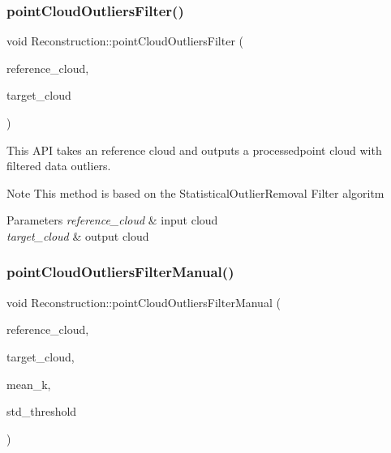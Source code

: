 \subsubsection{\texorpdfstring{point\+Cloud\+Outliers\+Filter()}{pointCloudOutliersFilter()}}
{\footnotesize\ttfamily void Reconstruction\+::point\+Cloud\+Outliers\+Filter (\begin{DoxyParamCaption}\item[{pcl\+::\+Point\+Cloud$<$ pcl\+::\+Point\+X\+Y\+Z\+R\+G\+B\+Normal $>$\+::Ptr \&}]{reference\+\_\+cloud,  }\item[{pcl\+::\+Point\+Cloud$<$ pcl\+::\+Point\+X\+Y\+Z\+R\+G\+B\+Normal $>$\+::Ptr \&}]{target\+\_\+cloud }\end{DoxyParamCaption})}



This A\+PI takes an reference cloud and outputs a processedpoint cloud with filtered data outliers. 

\begin{DoxyNote}{Note}
This method is based on the Statistical\+Outlier\+Removal Filter algoritm 
\end{DoxyNote}

\begin{DoxyParams}{Parameters}
{\em reference\+\_\+cloud} & input cloud \\
\hline
{\em target\+\_\+cloud} & output cloud \\
\hline
\end{DoxyParams}
\mbox{\label{classReconstruction_ac7cff09bc04f6579b54932df8eb9b6ab}} 
\subsubsection{\texorpdfstring{point\+Cloud\+Outliers\+Filter\+Manual()}{pointCloudOutliersFilterManual()}}
{\footnotesize\ttfamily void Reconstruction\+::point\+Cloud\+Outliers\+Filter\+Manual (\begin{DoxyParamCaption}\item[{pcl\+::\+Point\+Cloud$<$ pcl\+::\+Point\+X\+Y\+Z\+R\+G\+B\+Normal $>$\+::Ptr \&}]{reference\+\_\+cloud,  }\item[{pcl\+::\+Point\+Cloud$<$ pcl\+::\+Point\+X\+Y\+Z\+R\+G\+B\+Normal $>$\+::Ptr \&}]{target\+\_\+cloud,  }\item[{int}]{mean\+\_\+k,  }\item[{double}]{std\+\_\+threshold }\end{DoxyParamCaption})}



